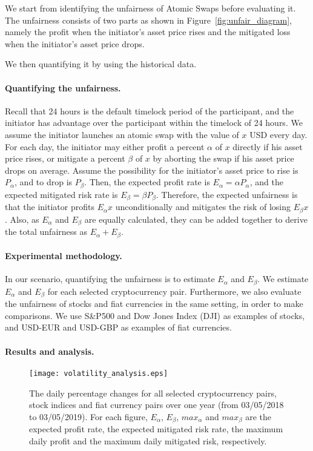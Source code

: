 We start from identifying the unfairness of Atomic Swaps before evaluating it.
The unfairness consists of two parts as shown in Figure~\ref{fig:unfair_diagram}, namely the profit when the initiator's asset price rises and the mitigated loss when the initiator's asset price drops.

We then quantifying it by using the historical data.

\paragraph{Quantifying the unfairness.}
Recall that 24 hours is the default timelock period of the participant,
and the initiator has advantage over the participant within the timelock of 24 hours.
We assume the initiator launches an atomic swap with the value of $x$ USD every day.
For each day, the initiator may either profit a percent $\alpha$ of $x$ directly if his asset price rises,
or mitigate a percent $\beta$ of $x$ by aborting the swap if his asset price drops on average.
Assume the possibility for the initiator's asset price to rise is $P_{\alpha}$, and to drop is $P_{\beta}$.
Then, the expected profit rate is $E_{\alpha} = \alpha P_{\alpha}$,
and the expected mitigated risk rate is $E_{\beta} = \beta P_{\beta}$.
Therefore, the expected unfairness is that the initiator profits $E_{\alpha} x$ unconditionally and mitigates the risk of losing $E_{\beta} x$.
Also, as $E_\alpha$ and $E_\beta$ are equally calculated, they can be added together to derive the total unfairness as $E_\alpha + E_\beta$.

\paragraph{Experimental methodology.}
In our scenario, quantifying the unfairness is to estimate $E_{\alpha}$ and $E_{\beta}$.
We estimate $E_{\alpha}$ and $E_{\beta}$ for each selected cryptocurrency pair.
Furthermore,  we also evaluate the unfairness of stocks and fiat currencies in the same setting, in order to make comparisons.
We use S\&P500 and Dow Jones Index (DJI) as examples of stocks, and USD-EUR and USD-GBP as examples of fiat currencies.

\paragraph{Results and analysis.}

\begin{figure*}
    \texttt{[image: volatility\_analysis.eps]}
    \caption{The daily percentage changes for all selected cryptocurrency pairs, stock indices and fiat currency pairs over one year (from 03/05/2018 to 03/05/2019). For each figure, $E_{\alpha}$, $E_{\beta}$, $max_\alpha$ and $max_\beta$ are the expected profit rate, the expected mitigated risk rate, the maximum daily profit and the maximum daily mitigated risk, respectively.}
    \label{fig:volatility_analysis}
\end{figure*}

